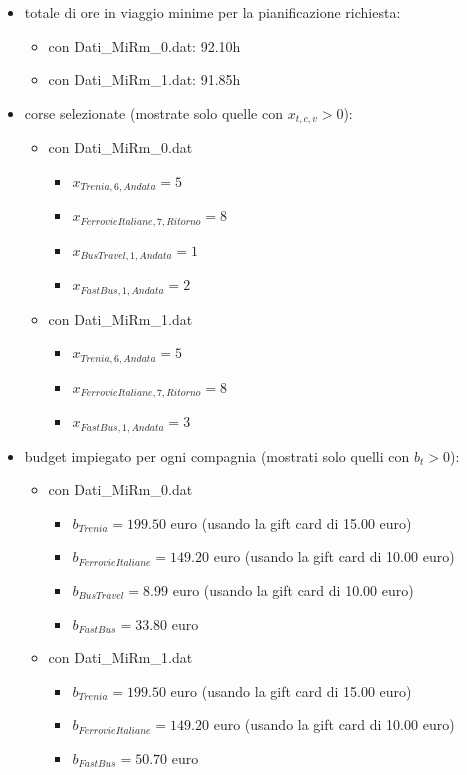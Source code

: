 \documentclass[main.tex]{subfiles}
\begin{document}
\begin{itemize}
    \item totale di ore in viaggio minime per la pianificazione richiesta:
    \begin{itemize}
        \item con Dati\_MiRm\_0.dat: 92.10h
        \item con Dati\_MiRm\_1.dat: 91.85h
    \end{itemize}
    \item corse selezionate (mostrate solo quelle con $x_{t,c,v} > 0$):
    \begin{itemize}
        \item con Dati\_MiRm\_0.dat
        \begin{itemize}
            \item $x_{Trenia,6,Andata} = 5$
            \item $x_{FerrovieItaliane,7,Ritorno} = 8$
            \item $x_{BusTravel,1,Andata} = 1$
            \item $x_{FastBus,1,Andata} = 2$
        \end{itemize}
        \item con Dati\_MiRm\_1.dat
        \begin{itemize}
            \item $x_{Trenia,6,Andata} = 5$
            \item $x_{FerrovieItaliane,7,Ritorno} = 8$
            \item $x_{FastBus,1,Andata} = 3$
        \end{itemize}
    \end{itemize}
    \item budget impiegato per ogni compagnia (mostrati solo quelli con $b_t > 0$):
    \begin{itemize}
        \item con Dati\_MiRm\_0.dat
        \begin{itemize}
            \item $b_{Trenia} = 199.50$ euro (usando la gift card di 15.00 euro)
            \item $b_{FerrovieItaliane} = 149.20$ euro (usando la gift card di 10.00 euro)
            \item $b_{BusTravel} =  8.99$ euro (usando la gift card di 10.00 euro)
            \item $b_{FastBus} = 33.80$ euro
        \end{itemize}
        \item con Dati\_MiRm\_1.dat
        \begin{itemize}
            \item $b_{Trenia} = 199.50$ euro (usando la gift card di 15.00 euro)
            \item $b_{FerrovieItaliane} = 149.20$ euro (usando la gift card di 10.00 euro)
            \item $b_{FastBus} = 50.70$ euro
        \end{itemize}
    \end{itemize}
\end{itemize}
\end{document}
